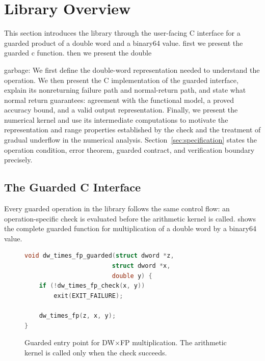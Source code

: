 \section{Library Overview}
\label{sec:overview}

This section introduces the library through the user-facing C interface for a
guarded product of a double word and a binary64 value. 
first we present the guarded c function. 
then we present the double 

garbage:
We first define the double-word representation needed
to understand the operation.  We then present the C implementation of the
guarded interface, explain its nonreturning failure path and normal-return
path, and state what normal return guarantees: agreement with the functional
model, a proved accuracy bound, and a valid output representation.  Finally,
we present the numerical kernel and use its intermediate computations to
motivate the representation and range properties established by the check and
the treatment of gradual underflow in the numerical analysis.
Section~\ref{sec:specification} states the operation condition, error theorem,
guarded contract, and verification boundary precisely.

\subsection{The Guarded C Interface}
\label{sec:overview-interface}

Every guarded operation in the library follows the same control flow: an
operation-specific check is evaluated before the arithmetic kernel is called.
 shows the complete guarded function for
multiplication of a double word by a binary64 value.

\begin{figure}[t]
  \begin{lstlisting}[language=C]
void dw_times_fp_guarded(struct dword *z,
                        struct dword *x,
                        double y) {
    if (!dw_times_fp_check(x, y))
        exit(EXIT_FAILURE);

    dw_times_fp(z, x, y);
}
  \end{lstlisting}
  \caption{Guarded entry point for DW$\times$FP multiplication.  The
  arithmetic kernel is called only when the check succeeds.}
  \label{fig:guarded-interface}
\end{figure}

